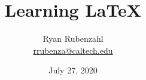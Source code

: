 \documentclass[10pt]{beamer}
\begin{document}
\author[Ryan Rubenzahl]{\begin{tabular}{c} 
	Ryan Rubenzahl \\
    \href{mailto:rrubenza@caltech.edu}{rrubenza@caltech.edu} \\ 
\end{tabular}}

\date[July 27, 2020]{July 27, 2020}
\title[Learning \LaTeX \hspace{.81\textwidth} \insertframenumber/\inserttotalframenumber]{{\Large Learning \LaTeX}}

\beamertemplatenavigationsymbolsempty

\def \bi {\begin{itemize}\item}
\def \ei {\end{itemize}}

\frame{\titlepage}



\end{document}
